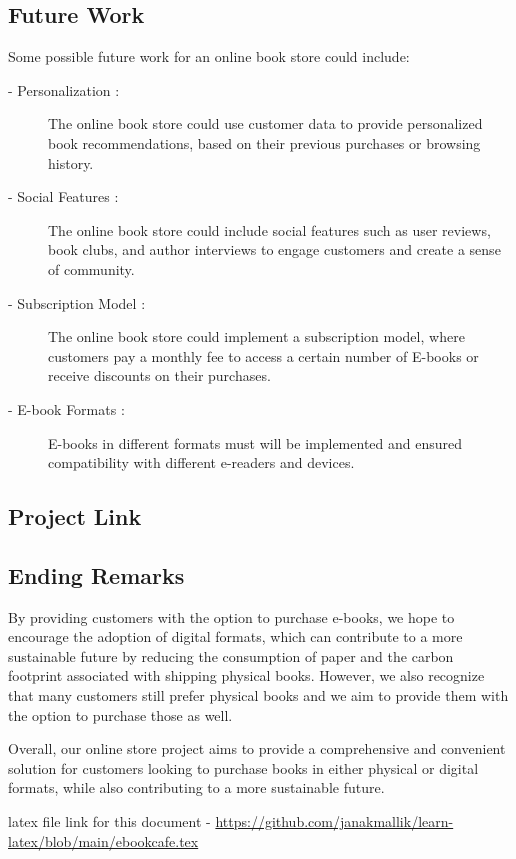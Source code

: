 \documentclass[12pt,a4paper]{article}
\begin{document}
\subsection{Future Work}
Some possible future work for an online book store could include:
\begin{description} 
    \item[\hspace{7mm}- Personalization :] The online book store could use customer data to provide personalized book recommendations, based on their previous purchases or browsing history.
    \item[\hspace{7mm}- Social Features :] The online book store could include social features such as user reviews, book clubs, and author interviews to engage customers and create a sense of community.
    \item[\hspace{7mm}- Subscription Model :] The online book store could implement a subscription model, where customers pay a monthly fee to access a certain number of E-books or receive discounts on their purchases.
    \item[\hspace{7mm}- E-book Formats :] E-books in different formats must will be implemented and ensured compatibility with different e-readers and devices.
\end{description}
\subsection{Project Link}
\subsection{Ending Remarks}
By providing customers with the option to purchase e-books, we hope to encourage the adoption of digital formats, which can contribute to a more sustainable future by reducing the consumption of paper and the carbon footprint associated with shipping physical books. However, we also recognize that many customers still prefer physical books and we aim to provide them with the option to purchase those as well.

Overall, our online store project aims to provide a comprehensive and convenient solution for customers looking to purchase books in either physical or digital formats, while also contributing to a more sustainable future.

\vspace{2cm}
latex file link for this document - \href{https://github.com/janakmallik/learn-latex/blob/main/ebookcafe.tex}{https://github.com/janakmallik/learn-latex/blob/main/ebookcafe.tex}
\end{document}
